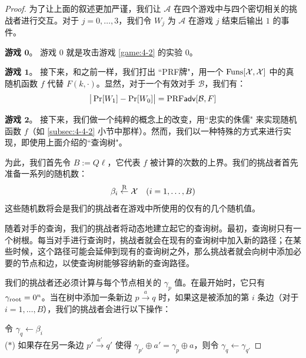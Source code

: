 \begin{proof}
为了让上面的叙述更加严谨，我们让 $\mathcal{A}$ 在四个游戏中与四个密切相关的挑战者进行交互。对于 $j=0,\dots,3$，我们令 $W_j$ 为 $\mathcal{A}$ 在游戏 $j$ 结束后输出 $1$ 的事件。

\vspace{5pt}

\textbf{游戏 $\mathbf{0}$}。
游戏 $0$ 就是攻击游戏 \ref{game:4-2} 的实验 $0$。

\vspace{5pt}

\textbf{游戏 $\mathbf{1}$}。
接下来，和之前一样，我们打出 ``PRF牌"，用一个 ${\rm Funs}[\mathcal{X},\mathcal{X}]$ 中的真随机函数 $f$ 代替 $F(k,\cdot)$。显然，对于一个有效对手 $\mathcal{B}$，我们有：
\begin{equation}\label{eq:6-9}
\big\lvert
\Pr[W_1]-\Pr[W_0]
\big\rvert
={\rm PRF}\mathsf{adv}[\mathcal{B},F]
\end{equation}

\textbf{游戏 $\mathbf{2}$}。
接下来，我们做一个纯粹的概念上的改变，用``忠实的侏儒" 来实现随机函数 $f$（如 \ref{subsec:4-4-2} 小节中那样）。然而，我们以一种特殊的方式来进行实现，即使用上面介绍的``查询树"。

为此，我们首先令 $B:=Q\ell$，它代表 $f$ 被计算的次数的上界。我们的挑战者首先准备一系列的随机数：
\[
\beta_i\overset{\rm R}\leftarrow\mathcal{X}\quad
(i=1,\dots,B)
\]
这些随机数将会是我们的挑战者在游戏中所使用的仅有的几个随机值。

随着对手的查询，我们的挑战者将动态地建立起它的查询树。最初，查询树只有一个树根。每当对手进行查询时，挑战者就会在现有的查询树中加入新的路径；在某些时候，这个路径可能会延伸到现有的查询树之外，那么挑战者就会向树中添加必要的节点和边，以使查询树能够容纳新的查询路径。

我们的挑战者还必须计算与每个节点相关的 $\gamma_p$ 值。在最开始时，它只有 $\gamma_{\rm root}=0^n$。当在树中添加一条新边 $p\overset{a}\rightarrow q$ 时，如果这是被添加的第 $i$ 条边（对于 $i=1,\dots,B$），我们的挑战者会进行以下操作：

\vspace{8pt}

\hspace*{5pt} 令 $\gamma_q\leftarrow\beta_i$\\
\hspace*{1pt} ($*$)
\hspace*{4.5pt} 如果存在另一条边 $p'\overset{a'}\rightarrow q'$ 使得 $\gamma_{p'}\oplus a'=\gamma_p\oplus a$，则令 $\gamma_q\leftarrow\gamma_{q'}$


\end{proof}
